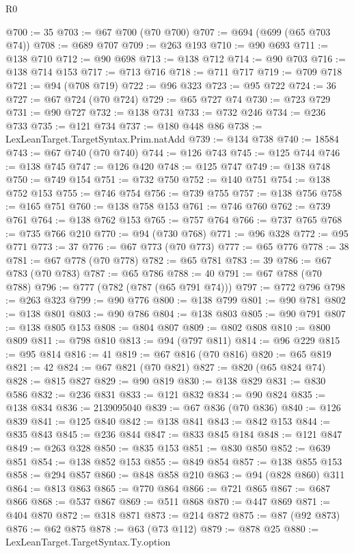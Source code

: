 \begin{lexlean}{R0}
\begin{coremodule}
@700 := 35
@703 := @67 @700 (@70 @700)
@707 := @694 (@699 (@65 @703 @74))
@708 := @689 @707
@709 := @263 @193
@710 := @90 @693
@711 := @138 @710
@712 := @90 @698
@713 := @138 @712
@714 := @90 @703
@716 := @138 @714 @153
@717 := @713 @716
@718 := @711 @717
@719 := @709 @718
@721 := @94 (@708 @719)
@722 := @96 @323
@723 := @95 @722
@724 := 36
@727 := @67 @724 (@70 @724)
@729 := @65 @727 @74
@730 := @723 @729
@731 := @90 @727
@732 := @138 @731
@733 := @732 @246
@734 := @236 @733
@735 := @121 @734
@737 := @180 @448 @86
@738 := LexLeanTarget.TargetSyntax.Prim.natAdd
@739 := @134 @738
@740 := 18584
@743 := @67 @740 (@70 @740)
@744 := @126 @743
@745 := @125 @744
@746 := @138 @745
@747 := @126 @420
@748 := @125 @747
@749 := @138 @748
@750 := @749 @154
@751 := @732 @750
@752 := @140 @751
@754 := @138 @752 @153
@755 := @746 @754
@756 := @739 @755
@757 := @138 @756
@758 := @165 @751
@760 := @138 @758 @153
@761 := @746 @760
@762 := @739 @761
@764 := @138 @762 @153
@765 := @757 @764
@766 := @737 @765
@768 := @735 @766 @210
@770 := @94 (@730 @768)
@771 := @96 @328
@772 := @95 @771
@773 := 37
@776 := @67 @773 (@70 @773)
@777 := @65 @776
@778 := 38
@781 := @67 @778 (@70 @778)
@782 := @65 @781
@783 := 39
@786 := @67 @783 (@70 @783)
@787 := @65 @786
@788 := 40
@791 := @67 @788 (@70 @788)
@796 := @777 (@782 (@787 (@65 @791 @74)))
@797 := @772 @796
@798 := @263 @323
@799 := @90 @776
@800 := @138 @799
@801 := @90 @781
@802 := @138 @801
@803 := @90 @786
@804 := @138 @803
@805 := @90 @791
@807 := @138 @805 @153
@808 := @804 @807
@809 := @802 @808
@810 := @800 @809
@811 := @798 @810
@813 := @94 (@797 @811)
@814 := @96 @229
@815 := @95 @814
@816 := 41
@819 := @67 @816 (@70 @816)
@820 := @65 @819
@821 := 42
@824 := @67 @821 (@70 @821)
@827 := @820 (@65 @824 @74)
@828 := @815 @827
@829 := @90 @819
@830 := @138 @829
@831 := @830 @586
@832 := @236 @831
@833 := @121 @832
@834 := @90 @824
@835 := @138 @834
@836 := 2139095040
@839 := @67 @836 (@70 @836)
@840 := @126 @839
@841 := @125 @840
@842 := @138 @841
@843 := @842 @153
@844 := @835 @843
@845 := @236 @844
@847 := @833 @845 @184
@848 := @121 @847
@849 := @263 @328
@850 := @835 @153
@851 := @830 @850
@852 := @639 @851
@854 := @138 @852 @153
@855 := @849 @854
@857 := @138 @855 @153
@858 := @294 @857
@860 := @848 @858 @210
@863 := @94 (@828 @860) @311
@864 := @813 @863
@865 := @770 @864
@866 := @721 @865
@867 := @687 @866
@868 := @537 @867
@869 := @511 @868
@870 := @447 @869
@871 := @404 @870
@872 := @318 @871
@873 := @214 @872
@875 := @87 (@92 @873)
@876 := @62 @875
@878 := @63 (@73 @112)
@879 := @878 @25
@880 := LexLeanTarget.TargetSyntax.Ty.option

\end{coremodule}
\end{lexlean}
